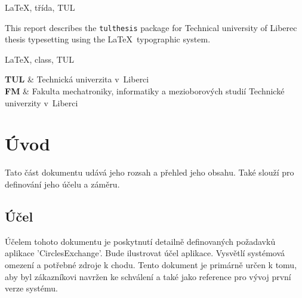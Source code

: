 \documentclass[FM,SP]{tulthesis}
\newcommand{\appName}{CirclesExchange}
\newcommand{\appNameQ}{'\appName'}
\begin{document}


\begin{keywordsCZ}
    \LaTeX, třída, TUL
\end{keywordsCZ}

\vspace{2cm}

\begin{abstractEN}
    This report describes the \texttt{tulthesis} package for Technical university of
    Liberec thesis typesetting using the \LaTeX\ typographic system.
\end{abstractEN}

\begin{keywordsEN}
    \LaTeX, class, TUL
\end{keywordsEN}

\clearpage


\tableofcontents

\clearpage

\begin{abbrList}
    \textbf{TUL} & Technická univerzita v~Liberci \\
    \textbf{FM} & Fakulta mechatroniky, informatiky a mezioborových studií
    Technické univerzity v~Liberci
\end{abbrList}

\chapter{Úvod}
Tato část dokumentu udává jeho rozsah a přehled jeho obsahu. Také slouží pro definování jeho účelu a záměru.

\section{Účel}
Účelem tohoto dokumentu je poskytnutí detailně definovaných požadavků aplikace \appNameQ. Bude ilustrovat účel aplikace. Vysvětlí systémová omezení a potřebné zdroje k chodu. Tento dokument je primárně určen k tomu, aby byl zákazníkovi navržen ke schválení a také jako reference pro vývoj první verze systému.
\end{document}
